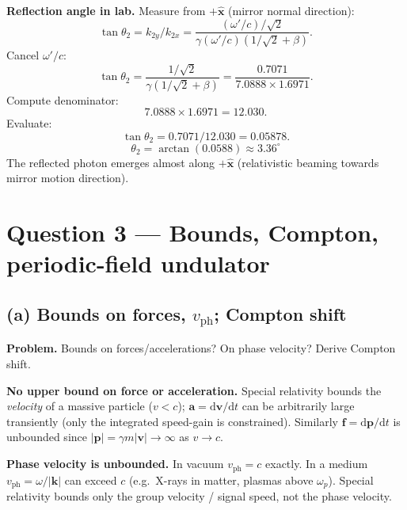 \documentclass[11pt]{article}
\newcommand{\de}{\mathrm{d}}
\begin{document}
\noindent\textbf{Reflection angle in lab.} Measure from $+\hat{\bm x}$ (mirror normal direction):
\[ \tan\theta_2 = k_{2y}/k_{2x} = \frac{(\omega'/c)/\sqrt 2}{\gamma(\omega'/c)(1/\sqrt 2+\beta)}. \]
Cancel $\omega'/c$:
\[ \tan\theta_2 = \frac{1/\sqrt 2}{\gamma(1/\sqrt 2+\beta)} = \frac{0.7071}{7.0888\times 1.6971}. \]
Compute denominator:
\[ 7.0888\times 1.6971 = 12.030. \]
Evaluate:
\[ \tan\theta_2 = 0.7071/12.030 = 0.05878. \]
\[ \boxed{\;\theta_2 = \arctan(0.0588) \approx 3.36^\circ\;} \]
The reflected photon emerges almost along $+\hat{\bm x}$ (relativistic beaming towards mirror motion direction).

\section*{Question 3 --- Bounds, Compton, periodic-field undulator}

\subsection*{(a) Bounds on forces, $v_\text{ph}$; Compton shift}

\textbf{Problem.} Bounds on forces/accelerations? On phase velocity? Derive Compton shift.

\textbf{No upper bound on force or acceleration.} Special relativity bounds the \emph{velocity} of a massive particle ($v<c$); $\bm a = \de\bm v/\de t$ can be arbitrarily large transiently (only the integrated speed-gain is constrained). Similarly $\bm f = \de\bm p/\de t$ is unbounded since $|\bm p|=\gamma m|\bm v|\to\infty$ as $v\to c$.

\noindent\textbf{Phase velocity is unbounded.} In vacuum $v_\text{ph}=c$ exactly. In a medium $v_\text{ph}=\omega/|\bm k|$ can exceed $c$ (e.g.\ X-rays in matter, plasmas above $\omega_p$). Special relativity bounds only the group velocity / signal speed, not the phase velocity.
\end{document}
